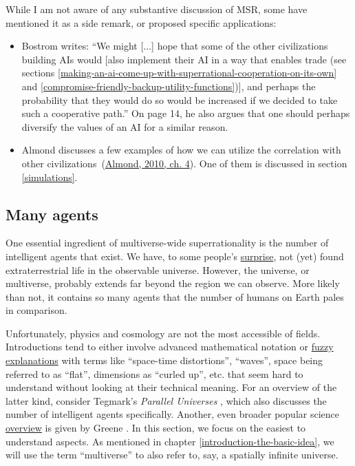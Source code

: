 While I am not aware of any substantive discussion of MSR, some have
mentioned it as a side remark, or proposed specific applications:

\begin{itemize}
\item
  Bostrom writes: ``We might {[}...{]}
  hope that some of the other civilizations building AIs would {[}also
  implement their AI in a way that enables trade (see sections
  \ref{making-an-ai-come-up-with-superrational-cooperation-on-its-own} and
  \ref{compromise-friendly-backup-utility-functions}){]}, and perhaps the probability that
  they would do so would be increased if we decided to take such a
  cooperative path.'' \parencite[page 4]{Bostrom2014-gy} On page 14, he also argues that one should perhaps
  diversify the values of an AI for a similar reason.
\item
  Almond discusses a few examples of how we can utilize the correlation
  with other
  civilizations~(\href{https://casparoesterheld.files.wordpress.com/2017/03/correlation2.pdf}{Almond,
  2010, ch. 4}). One of them is discussed in section \ref{simulations}.
\end{itemize}

\hypertarget{many-agents}{\subsection{Many agents}\label{many-agents}}

One essential ingredient of multiverse-wide superrationality is the
number of intelligent agents that exist. We have, to some people's
\href{https://en.wikipedia.org/wiki/Fermi_paradox}{surprise}, not
(yet) found extraterrestrial life in the observable universe. However,
the universe, or multiverse, probably extends far beyond the region we
can observe. More likely than not, it contains so many agents that the
number of humans on Earth pales in comparison.

Unfortunately, physics and cosmology are not the most accessible of
fields. Introductions tend to either involve advanced mathematical
notation or
\href{http://lesswrong.com/lw/ip/fake_explanations/}{fuzzy
explanations} with terms like ``space-time distortions'', ``waves'',
space being referred to as ``flat'', dimensions as ``curled up'', etc.
that seem hard to understand without looking at their technical meaning.
For an overview of the latter kind, consider Tegmark's
\emph{Parallel Universes} \citeyear{Tegmark2003-sl},
which also discusses the number of intelligent agents specifically.
Another, even broader popular science
\href{https://en.wikipedia.org/wiki/Multiverse\#Brian_Greene.27s_nine_types}{overview}
is given by Greene \citeyear{Greene2011-hv}. In this section, we
focus on the easiest to understand aspects. As mentioned in chapter
\ref{introduction-the-basic-idea}, we will use the term ``multiverse'' to also refer
to, say, a spatially infinite universe.

